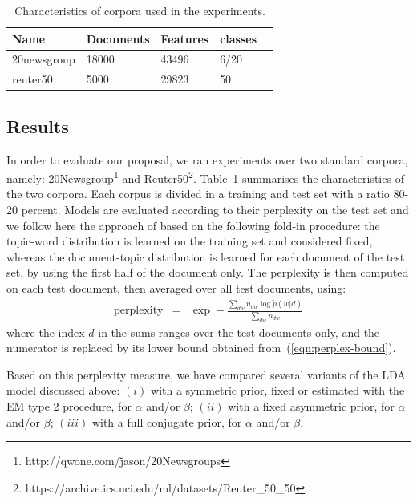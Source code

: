 \begin{table}
    \begin{center}
        \begin{tabular}{ | l | l | l | l | p{5cm} |}
            \hline
            Name & Documents & Features & classes\\ \hline
            20newsgroup & 18000 & 43496 & 6/20 \\ \hline
            reuter50 & 5000 & 29823 & 50 \\ \hline
            \hline
        \end{tabular}
    \end{center}
    \caption{Characteristics of corpora used in the experiments.}
    \label{table:dataset}
\end{table}
\subsection{Results} 
In order to evaluate our proposal, we ran experiments over two standard corpora, namely: 20Newsgroup\footnote{http://qwone.com/\~jason/20Newsgroups} and Reuter50\footnote{https://archive.ics.uci.edu/ml/datasets/Reuter\_50\_50}.
Table~\ref{table:dataset} summarises the characteristics of the two corpora. Each corpus is divided in a training and test set with a ratio 80-20 percent. Models are evaluated according to their perplexity on the test set and we follow here the  approach of \cite{asuncion_smoothing_2009} based on the following fold-in procedure: the topic-word distribution is learned on the training set and considered fixed, whereas the document-topic distribution is learned for each document of the test set, by using the first half of the document only. The perplexity is then computed on each test document, then averaged over all test documents, using:
\begin{eqnarray*}
    \textrm{perplexity} & = & \exp-\frac{\sum_{dw}n_{dw}\log\tilde{p}(w|d)}{\sum_{dw}n_{dw}}
\end{eqnarray*}
where the index $d$ in the sums ranges over the test documents only, and the numerator is replaced by its lower bound obtained from~(\ref{eqn:perplex-bound}).

Based on this perplexity measure, we have compared several variants of the LDA model discussed above: $(i)$ with a symmetric prior, fixed or estimated with the EM type 2 procedure, for $\alpha$ and/or $\beta$; $(ii)$ with a fixed asymmetric prior, for $\alpha$ and/or $\beta$; $(iii)$ with a full conjugate prior, for $\alpha$ and/or $\beta$.

